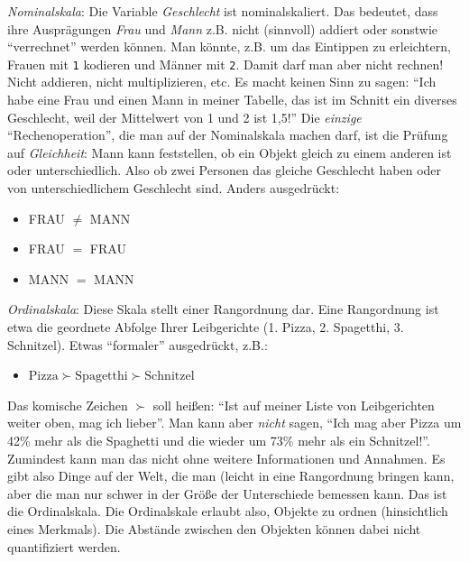 \documentclass[
  letterpaper,
  twoside,
  open=any]{scrbook}
\providecommand{\tightlist}{%
  \setlength{\itemsep}{0pt}\setlength{\parskip}{0pt}}\usepackage{longtable,booktabs,array}
\theoremstyle{definition}
\theoremstyle{definition}
\theoremstyle{definition}
\theoremstyle{remark}
\begin{document}
\emph{Nominalskala}: Die Variable \emph{Geschlecht} ist nominalskaliert.
Das bedeutet, dass ihre Ausprägungen \emph{Frau} und \emph{Mann} z.B.
nicht (sinnvoll) addiert oder sonstwie \enquote{verrechnet} werden
können. Man könnte, z.B. um das Eintippen zu erleichtern, Frauen mit
\texttt{1} kodieren und Männer mit \texttt{2}. Damit darf man aber nicht
rechnen! Nicht addieren, nicht multiplizieren, etc. Es macht keinen Sinn
zu sagen: \enquote{Ich habe eine Frau und einen Mann in meiner Tabelle,
das ist im Schnitt ein diverses Geschlecht, weil der Mittelwert von 1
und 2 ist 1,5!} Die \emph{einzige} \enquote{Rechenoperation}, die man
auf der Nominalskala machen darf, ist die Prüfung auf \emph{Gleichheit}:
Mann kann feststellen, ob ein Objekt gleich zu einem anderen ist oder
unterschiedlich. Also ob zwei Personen das gleiche Geschlecht haben oder
von unterschiedlichem Geschlecht sind. Anders ausgedrückt:

\begin{itemize}
\tightlist
\item
  FRAU \(\ne\) MANN
\item
  FRAU \(=\) FRAU
\item
  MANN \(=\) MANN
\end{itemize}

\emph{Ordinalskala}: Diese Skala stellt einer Rangordnung dar. Eine
Rangordnung ist etwa die geordnete Abfolge Ihrer Leibgerichte (1. Pizza,
2. Spagetthi, 3. Schnitzel). Etwas \enquote{formaler} ausgedrückt, z.B.:

\begin{itemize}
\tightlist
\item
  \(\text{Pizza} \succ \text{Spagetthi} \succ \text{Schnitzel}\)
\end{itemize}

Das komische Zeichen \(\succ\) soll heißen: \enquote{Ist auf meiner
Liste von Leibgerichten weiter oben, mag ich lieber}. Man kann aber
\emph{nicht} sagen, \enquote{Ich mag aber Pizza um 42\% mehr als die
Spaghetti und die wieder um 73\% mehr als ein Schnitzel!}. Zumindest
kann man das nicht ohne weitere Informationen und Annahmen. Es gibt also
Dinge auf der Welt, die man (leicht in eine Rangordnung bringen kann,
aber die man nur schwer in der Größe der Unterschiede bemessen kann. Das
ist die Ordinalskala. Die Ordinalskale erlaubt also, Objekte zu ordnen
(hinsichtlich eines Merkmals). Die Abstände zwischen den Objekten können
dabei nicht quantifiziert werden.
\end{document}
